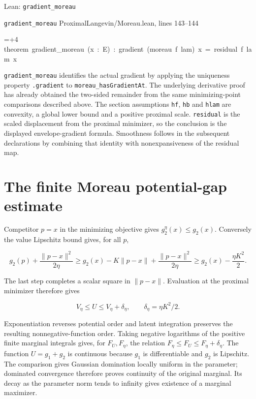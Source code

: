 \documentclass[11pt,a4paper]{report}
\newlength{\leancharwidth}
\newenvironment{leancode}{\par\smallskip\begingroup\ttfamily\footnotesize\raggedright
  \settowidth{\leancharwidth}{M}\setlength{\parskip}{0pt}\setlength{\parindent}{0pt}
  \frenchspacing}{\par\endgroup\smallskip}
\newcommand{\leanline}[2]{\hangindent=\dimexpr#1\leancharwidth+4\leancharwidth\relax
  \hangafter=1\noindent\hspace*{#1\leancharwidth}#2\par}
\newcommand{\leansource}[1]{\par{\footnotesize\color{leanmuted}#1}\par}
\newcommand{\leanlabel}[1]{\par\smallskip\noindent{\small\bfseries #1}\par}
\begin{document}
\begin{leanbox}{Lean: \texttt{gradient\_\allowbreak{}moreau}}
\leansource{\texttt{gradient\_\allowbreak{}moreau} \quad ProximalLangevin/\allowbreak{}Moreau.lean, lines 143–144}
\begin{leancode}
\leanline{0}{theorem\ gradient\_moreau\ (x\ :\ E)\ :\ gradient\ (moreau\ f\ lam)\ x\ =\ residual\ f\ lam\ x}
\end{leancode}
\leanlabel{How the Lean proof follows the argument}
\texttt{gradient\_\allowbreak{}moreau} identifies the actual gradient by applying the uniqueness property \texttt{.\allowbreak{}gradient} to \texttt{moreau\_\allowbreak{}has\allowbreak{}Gradient\allowbreak{}At}. The underlying derivative proof has already obtained the two-sided remainder from the same minimizing-point comparisons described above. The section assumptions \texttt{hf}, \texttt{hb} and \texttt{hlam} are convexity, a global lower bound and a positive proximal scale. \texttt{residual} is the scaled displacement from the proximal minimizer, so the conclusion is the displayed envelope-gradient formula. Smoothness follows in the subsequent declarations by combining that identity with nonexpansiveness of the residual map.
\end{leanbox}
\section{\texorpdfstring{The finite Moreau potential-gap estimate}{The finite Moreau potential-gap estimate}}



Competitor \(p=x\) in the minimizing objective gives \(g_2^\eta(x)\le g_2(x)\). Conversely the value Lipschitz bound gives, for all \(p\),

\[g_2(p)+\frac{\|p-x\|^2}{2\eta}
\ge g_2(x)-K\|p-x\|+\frac{\|p-x\|^2}{2\eta}
\ge g_2(x)-\frac{\eta K^2}{2}.\]

The last step completes a scalar square in \(\|p-x\|\). Evaluation at the proximal minimizer therefore gives

\[V_\eta\le U\le V_\eta+\delta_\eta,\qquad\delta_\eta=\eta K^2/2.\]

Exponentiation reverses potential order and latent integration preserves the resulting nonnegative-function order. Taking negative logarithms of the positive finite marginal integrals gives, for \(F_U,F_\eta\), the relation \(F_\eta\le F_U\le F_\eta+\delta_\eta\). The function \(U=g_1+g_2\) is continuous because \(g_1\) is differentiable and \(g_2\) is Lipschitz. The comparison gives Gaussian domination locally uniform in the parameter; dominated convergence therefore proves continuity of the original marginal. Its decay as the parameter norm tends to infinity gives existence of a marginal maximizer.
\end{document}
